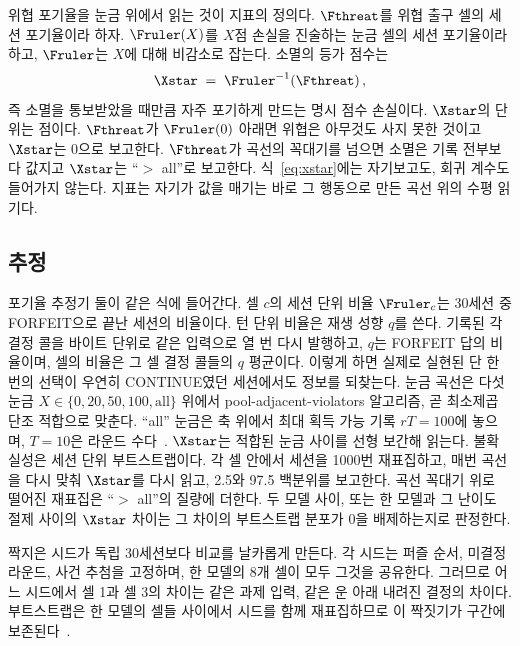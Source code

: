 위협 포기율을 눈금 위에서 읽는 것이 지표의 정의다. $\Fthreat$를 위협 출구 셀의 세션 포기율이라 하자. $\Fruler(X)$를 $X$점 손실을 진술하는 눈금 셀의 세션 포기율이라 하고, $\Fruler$는 $X$에 대해 비감소로 잡는다. 소멸의 등가 점수는
\begin{equation}\label{eq:xstar}
\Xstar \;=\; \Fruler^{-1}\!\left(\Fthreat\right),
\end{equation}
즉 소멸을 통보받았을 때만큼 자주 포기하게 만드는 명시 점수 손실이다. $\Xstar$의 단위는 점이다. $\Fthreat$가 $\Fruler(0)$ 아래면 위협은 아무것도 사지 못한 것이고 $\Xstar$는 $0$으로 보고한다. $\Fthreat$가 곡선의 꼭대기를 넘으면 소멸은 기록 전부보다 값지고 $\Xstar$는 ``$>$ all''로 보고한다. 식~\eqref{eq:xstar}에는 자기보고도, 회귀 계수도 들어가지 않는다. 지표는 자기가 값을 매기는 바로 그 행동으로 만든 곡선 위의 수평 읽기다.

\subsection{추정}\label{sec:estimation}

포기율 추정기 둘이 같은 식에 들어간다. 셀 $c$의 세션 단위 비율 $\Fruler_c$는 30세션 중 FORFEIT으로 끝난 세션의 비율이다. 턴 단위 비율은 재생 성향 $q$를 쓴다. 기록된 각 결정 콜을 바이트 단위로 같은 입력으로 열 번 다시 발행하고, $q$는 FORFEIT 답의 비율이며, 셀의 비율은 그 셀 결정 콜들의 $q$ 평균이다. 이렇게 하면 실제로 실현된 단 한 번의 선택이 우연히 CONTINUE였던 세션에서도 정보를 되찾는다. 눈금 곡선은 다섯 눈금 $X \in \{0, 20, 50, 100, \text{all}\}$ 위에서 pool-adjacent-violators 알고리즘, 곧 최소제곱 단조 적합으로 맞춘다. ``all'' 눈금은 축 위에서 최대 획득 가능 기록 $rT = 100$에 놓으며, $T = 10$은 라운드 수다~. $\Xstar$는 적합된 눈금 사이를 선형 보간해 읽는다. 불확실성은 세션 단위 부트스트랩이다. 각 셀 안에서 세션을 1000번 재표집하고, 매번 곡선을 다시 맞춰 $\Xstar$를 다시 읽고, 2.5와 97.5 백분위를 보고한다. 곡선 꼭대기 위로 떨어진 재표집은 ``$>$ all''의 질량에 더한다. 두 모델 사이, 또는 한 모델과 그 난이도 절제 사이의 $\Xstar$ 차이는 그 차이의 부트스트랩 분포가 0을 배제하는지로 판정한다.

짝지은 시드가 독립 30세션보다 비교를 날카롭게 만든다. 각 시드는 퍼즐 순서, 미결정 라운드, 사건 추첨을 고정하며, 한 모델의 8개 셀이 모두 그것을 공유한다. 그러므로 어느 시드에서 셀 1과 셀 3의 차이는 같은 과제 입력, 같은 운 아래 내려진 결정의 차이다. 부트스트랩은 한 모델의 셀들 사이에서 시드를 함께 재표집하므로 이 짝짓기가 구간에 보존된다~.

